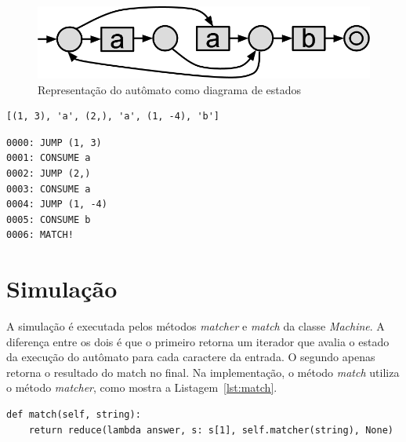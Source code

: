 \documentclass[a4paper,12pt,oneside,onecolumn]{uerj}
\begin{document}
\begin{figure}[!htbp]
  \centering
  \includegraphics[scale=0.4]{figures/exemplo_automato_puro.png}
  \caption{Representação do autômato como diagrama de estados}
  \label{fig:exemplo_automato_puro}
\end{figure}


{
  \lstset{%
    basicstyle=\ttfamily\normalsize,
  }
\begin{lstlisting}[caption={Representação do autômato como array},label=lst:automaton_array]
	[(1, 3), 'a', (2,), 'a', (1, -4), 'b']
\end{lstlisting}
}

\noindent\begin{minipage}{\textwidth}
{
  \lstset{%
    basicstyle=\ttfamily\normalsize,
  }


\begin{lstlisting}[caption={Representação do autômato como instruções},label=lst:automaton_instr]
0000: JUMP (1, 3)
0001: CONSUME a
0002: JUMP (2,)
0003: CONSUME a
0004: JUMP (1, -4)
0005: CONSUME b
0006: MATCH!
\end{lstlisting}
}
\end{minipage}


\section{Simulação}

A simulação é executada pelos métodos \emph{matcher} e \emph{match} da classe \emph{Machine}. A diferença entre os dois é que o primeiro retorna um iterador que avalia o estado da execução do autômato para cada caractere da entrada. O segundo apenas retorna o resultado do match no final. Na implementação, o método \emph{match} utiliza o método \emph{matcher}, como mostra a Listagem~\ref{lst:match}.

\vspace{0.5cm}
\begin{lstlisting}[caption={Implementação do método \emph{match}},label=lst:match]
def match(self, string):
    return reduce(lambda answer, s: s[1], self.matcher(string), None)
\end{lstlisting}
\end{document}
